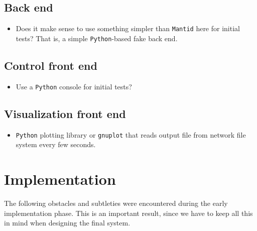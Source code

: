\documentclass[a4paper,english,numbers=noenddot,bibliography=totoc,chapterprefix=on,DIV=12]{scrartcl}
\newcommand{\mantid}{\texttt{Mantid}\xspace}
\newcommand{\python}{\texttt{Python}\xspace}
\begin{document}
\subsection{Back end}

\begin{itemize}
  \item Does it make sense to use something simpler than \mantid here for initial tests?
    That is, a simple \python-based fake back end.
\end{itemize}

\subsection{Control front end}

\begin{itemize}
  \item Use a \python console for initial tests?
\end{itemize}

\subsection{Visualization front end}

\begin{itemize}
  \item \python plotting library or \texttt{gnuplot} that reads output file from network file system every few seconds.
\end{itemize}


\section{Implementation}

The following obstacles and subtleties were encountered during the early implementation phase.
This is an important result, since we have to keep all this in mind when designing the final system.
\end{document}
